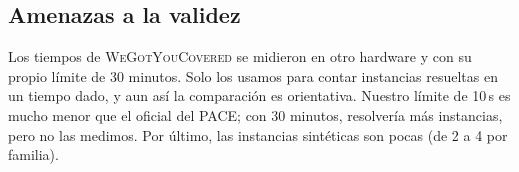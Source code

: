 \subsection{Amenazas a la validez}
Los tiempos de \textsc{WeGotYouCovered} se midieron en otro hardware y con su propio límite de 30 minutos. Solo los usamos para contar instancias resueltas en un tiempo dado, y aun así la comparación es orientativa. Nuestro límite de 10\,s es mucho menor que el oficial del PACE; con 30 minutos, \hyvc{} resolvería más instancias, pero no las medimos. Por último, las instancias sintéticas son pocas (de 2 a 4 por familia).
